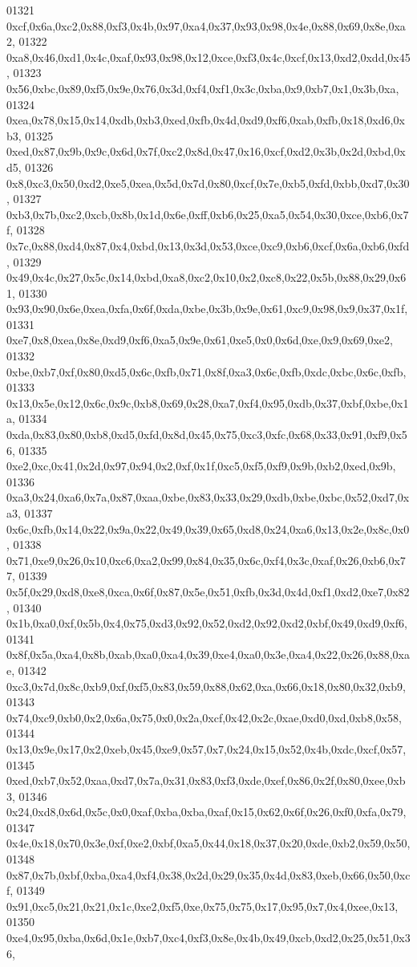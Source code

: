 \begin{DoxyCode}
01321   0xcf,0x6a,0xc2,0x88,0xf3,0x4b,0x97,0xa4,0x37,0x93,0x98,0x4e,0x88,0x69,0x8e,0xa2,
01322   0xa8,0x46,0xd1,0x4c,0xaf,0x93,0x98,0x12,0xce,0xf3,0x4c,0xcf,0x13,0xd2,0xdd,0x45,
01323   0x56,0xbc,0x89,0xf5,0x9e,0x76,0x3d,0xf4,0xf1,0x3c,0xba,0x9,0xb7,0x1,0x3b,0xa,
01324   0xea,0x78,0x15,0x14,0xdb,0xb3,0xed,0xfb,0x4d,0xd9,0xf6,0xab,0xfb,0x18,0xd6,0xb3,
01325   0xed,0x87,0x9b,0x9c,0x6d,0x7f,0xc2,0x8d,0x47,0x16,0xcf,0xd2,0x3b,0x2d,0xbd,0xd5,
01326   0x8,0xc3,0x50,0xd2,0xe5,0xea,0x5d,0x7d,0x80,0xcf,0x7e,0xb5,0xfd,0xbb,0xd7,0x30,
01327   0xb3,0x7b,0xc2,0xcb,0x8b,0x1d,0x6e,0xff,0xb6,0x25,0xa5,0x54,0x30,0xce,0xb6,0x7f,
01328   0x7c,0x88,0xd4,0x87,0x4,0xbd,0x13,0x3d,0x53,0xce,0xc9,0xb6,0xcf,0x6a,0xb6,0xfd,
01329   0x49,0x4c,0x27,0x5c,0x14,0xbd,0xa8,0xc2,0x10,0x2,0xc8,0x22,0x5b,0x88,0x29,0x61,
01330   0x93,0x90,0x6e,0xea,0xfa,0x6f,0xda,0xbe,0x3b,0x9e,0x61,0xc9,0x98,0x9,0x37,0x1f,
01331   0xe7,0x8,0xea,0x8e,0xd9,0xf6,0xa5,0x9e,0x61,0xe5,0x0,0x6d,0xe,0x9,0x69,0xe2,
01332   0xbe,0xb7,0xf,0x80,0xd5,0x6c,0xfb,0x71,0x8f,0xa3,0x6c,0xfb,0xdc,0xbc,0x6c,0xfb,
01333   0x13,0x5e,0x12,0x6c,0x9c,0xb8,0x69,0x28,0xa7,0xf4,0x95,0xdb,0x37,0xbf,0xbe,0x1a,
01334   0xda,0x83,0x80,0xb8,0xd5,0xfd,0x8d,0x45,0x75,0xc3,0xfc,0x68,0x33,0x91,0xf9,0x56,
01335   0xe2,0xc,0x41,0x2d,0x97,0x94,0x2,0xf,0x1f,0xc5,0xf5,0xf9,0x9b,0xb2,0xed,0x9b,
01336   0xa3,0x24,0xa6,0x7a,0x87,0xaa,0xbe,0x83,0x33,0x29,0xdb,0xbe,0xbc,0x52,0xd7,0xa3,
01337   0x6c,0xfb,0x14,0x22,0x9a,0x22,0x49,0x39,0x65,0xd8,0x24,0xa6,0x13,0x2e,0x8c,0x0,
01338   0x71,0xe9,0x26,0x10,0xc6,0xa2,0x99,0x84,0x35,0x6c,0xf4,0x3c,0xaf,0x26,0xb6,0x77,
01339   0x5f,0x29,0xd8,0xe8,0xca,0x6f,0x87,0x5e,0x51,0xfb,0x3d,0x4d,0xf1,0xd2,0xe7,0x82,
01340   0x1b,0xa0,0xf,0x5b,0x4,0x75,0xd3,0x92,0x52,0xd2,0x92,0xd2,0xbf,0x49,0xd9,0xf6,
01341   0x8f,0x5a,0xa4,0x8b,0xab,0xa0,0xa4,0x39,0xe4,0xa0,0x3e,0xa4,0x22,0x26,0x88,0xae,
01342   0xc3,0x7d,0x8c,0xb9,0xf,0xf5,0x83,0x59,0x88,0x62,0xa,0x66,0x18,0x80,0x32,0xb9,
01343   0x74,0xc9,0xb0,0x2,0x6a,0x75,0x0,0x2a,0xcf,0x42,0x2c,0xae,0xd0,0xd,0xb8,0x58,
01344   0x13,0x9e,0x17,0x2,0xeb,0x45,0xe9,0x57,0x7,0x24,0x15,0x52,0x4b,0xdc,0xcf,0x57,
01345   0xed,0xb7,0x52,0xaa,0xd7,0x7a,0x31,0x83,0xf3,0xde,0xef,0x86,0x2f,0x80,0xee,0xb3,
01346   0x24,0xd8,0x6d,0x5c,0x0,0xaf,0xba,0xba,0xaf,0x15,0x62,0x6f,0x26,0xf0,0xfa,0x79,
01347   0x4e,0x18,0x70,0x3e,0xf,0xe2,0xbf,0xa5,0x44,0x18,0x37,0x20,0xde,0xb2,0x59,0x50,
01348   0x87,0x7b,0xbf,0xba,0xa4,0xf4,0x38,0x2d,0x29,0x35,0x4d,0x83,0xeb,0x66,0x50,0xcf,
01349   0x91,0xc5,0x21,0x21,0x1c,0xe2,0xf5,0xe,0x75,0x75,0x17,0x95,0x7,0x4,0xee,0x13,
01350   0xe4,0x95,0xba,0x6d,0x1e,0xb7,0xc4,0xf3,0x8e,0x4b,0x49,0xcb,0xd2,0x25,0x51,0x36,

\end{DoxyCode}
